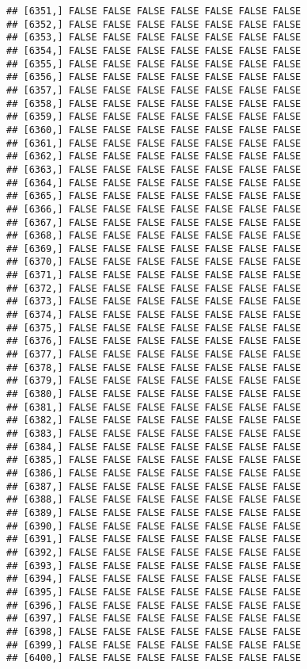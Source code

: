 \documentclass[
]{article}
\begin{document}
\begin{verbatim}
## [6351,] FALSE FALSE FALSE FALSE FALSE FALSE FALSE
## [6352,] FALSE FALSE FALSE FALSE FALSE FALSE FALSE
## [6353,] FALSE FALSE FALSE FALSE FALSE FALSE FALSE
## [6354,] FALSE FALSE FALSE FALSE FALSE FALSE FALSE
## [6355,] FALSE FALSE FALSE FALSE FALSE FALSE FALSE
## [6356,] FALSE FALSE FALSE FALSE FALSE FALSE FALSE
## [6357,] FALSE FALSE FALSE FALSE FALSE FALSE FALSE
## [6358,] FALSE FALSE FALSE FALSE FALSE FALSE FALSE
## [6359,] FALSE FALSE FALSE FALSE FALSE FALSE FALSE
## [6360,] FALSE FALSE FALSE FALSE FALSE FALSE FALSE
## [6361,] FALSE FALSE FALSE FALSE FALSE FALSE FALSE
## [6362,] FALSE FALSE FALSE FALSE FALSE FALSE FALSE
## [6363,] FALSE FALSE FALSE FALSE FALSE FALSE FALSE
## [6364,] FALSE FALSE FALSE FALSE FALSE FALSE FALSE
## [6365,] FALSE FALSE FALSE FALSE FALSE FALSE FALSE
## [6366,] FALSE FALSE FALSE FALSE FALSE FALSE FALSE
## [6367,] FALSE FALSE FALSE FALSE FALSE FALSE FALSE
## [6368,] FALSE FALSE FALSE FALSE FALSE FALSE FALSE
## [6369,] FALSE FALSE FALSE FALSE FALSE FALSE FALSE
## [6370,] FALSE FALSE FALSE FALSE FALSE FALSE FALSE
## [6371,] FALSE FALSE FALSE FALSE FALSE FALSE FALSE
## [6372,] FALSE FALSE FALSE FALSE FALSE FALSE FALSE
## [6373,] FALSE FALSE FALSE FALSE FALSE FALSE FALSE
## [6374,] FALSE FALSE FALSE FALSE FALSE FALSE FALSE
## [6375,] FALSE FALSE FALSE FALSE FALSE FALSE FALSE
## [6376,] FALSE FALSE FALSE FALSE FALSE FALSE FALSE
## [6377,] FALSE FALSE FALSE FALSE FALSE FALSE FALSE
## [6378,] FALSE FALSE FALSE FALSE FALSE FALSE FALSE
## [6379,] FALSE FALSE FALSE FALSE FALSE FALSE FALSE
## [6380,] FALSE FALSE FALSE FALSE FALSE FALSE FALSE
## [6381,] FALSE FALSE FALSE FALSE FALSE FALSE FALSE
## [6382,] FALSE FALSE FALSE FALSE FALSE FALSE FALSE
## [6383,] FALSE FALSE FALSE FALSE FALSE FALSE FALSE
## [6384,] FALSE FALSE FALSE FALSE FALSE FALSE FALSE
## [6385,] FALSE FALSE FALSE FALSE FALSE FALSE FALSE
## [6386,] FALSE FALSE FALSE FALSE FALSE FALSE FALSE
## [6387,] FALSE FALSE FALSE FALSE FALSE FALSE FALSE
## [6388,] FALSE FALSE FALSE FALSE FALSE FALSE FALSE
## [6389,] FALSE FALSE FALSE FALSE FALSE FALSE FALSE
## [6390,] FALSE FALSE FALSE FALSE FALSE FALSE FALSE
## [6391,] FALSE FALSE FALSE FALSE FALSE FALSE FALSE
## [6392,] FALSE FALSE FALSE FALSE FALSE FALSE FALSE
## [6393,] FALSE FALSE FALSE FALSE FALSE FALSE FALSE
## [6394,] FALSE FALSE FALSE FALSE FALSE FALSE FALSE
## [6395,] FALSE FALSE FALSE FALSE FALSE FALSE FALSE
## [6396,] FALSE FALSE FALSE FALSE FALSE FALSE FALSE
## [6397,] FALSE FALSE FALSE FALSE FALSE FALSE FALSE
## [6398,] FALSE FALSE FALSE FALSE FALSE FALSE FALSE
## [6399,] FALSE FALSE FALSE FALSE FALSE FALSE FALSE
## [6400,] FALSE FALSE FALSE FALSE FALSE FALSE FALSE

\end{verbatim}
\end{document}
